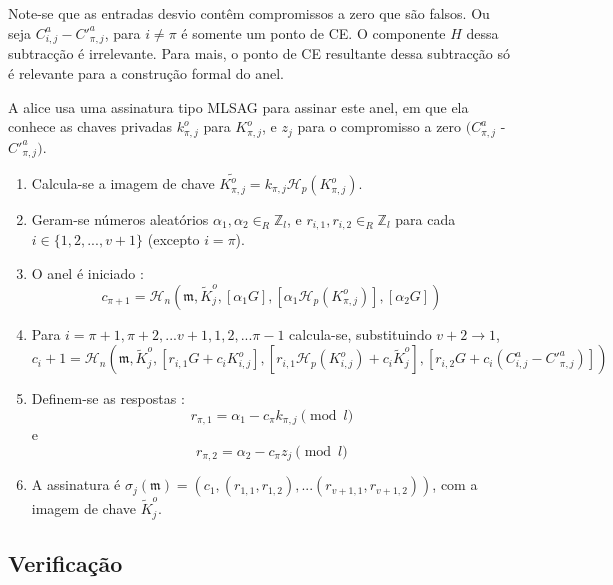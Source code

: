 \newline Note-se que as entradas desvio contêm compromissos a zero que são falsos. Ou seja $C^a_{i, j} - C'^a_{\pi, j}$, para $i\ne\pi$ é somente um ponto de CE. O componente $H$ dessa subtracção é irrelevante. Para mais, o ponto de CE resultante dessa subtracção só é relevante para a construção formal do anel.

A alice usa uma assinatura tipo MLSAG para assinar este anel, em que ela conhece as chaves privadas $k^o_{\pi,j}$ para $K^o_{\pi,j}$, e $z_j$ para o compromisso a zero $(C^a_{\pi,j}$ - $C'^a_{\pi,j})$.

\begin{enumerate}

    \item Calcula-se a imagem de chave \(\tilde{K^o_{\pi, j}} = k_{\pi, j} \mathcal{H}_p(K^o_{\pi, j})\).

    \item Geram-se números aleatórios \(\alpha_{1},\alpha_{2} \in_R \mathbb{Z}_l\), e \(r_{i, 1},r_{i, 2} \in_R \mathbb{Z}_l\) para cada \(i \in \{1, 2, ..., v+1\}\) (excepto \(i = \pi\)).

    \item O anel é iniciado :
    \vspace{.175cm}
	\[c_{\pi+1} = \mathcal{H}_n(\mathfrak{m}, \tilde{K}^o_j, [\alpha_1 G], [\alpha_1 \mathcal{H}_p(K^o_{\pi, j})], [\alpha_2 G])\]
    \vspace{.175cm}

    \item Para \(i = \pi+1, \pi+2, ... v+1, 1, 2, ... \pi-1\) calcula-se, substituindo \(v + 2 \rightarrow 1\),\vspace{.175cm}
\[c_i+1 = \mathcal{H}_n(\mathfrak{m}, \tilde{K}^o_j, [r_{i, 1} G + c_{i} K^o_{i, j}], [r_{i, 1} \mathcal{H}_p(K^o_{i, j}) + c_{i} \tilde{K}^o_j], [r_{i, 2} G + c_{i} (C^a_{i, j} - C'^a_{\pi, j})])\]

    \item Definem-se as respostas : \[r_{\pi, 1} = \alpha_{1} - c_{\pi} k_{\pi, j} \pmod l\] e \[r_{\pi, 2} = \alpha_{2} - c_{\pi} z_j \pmod l\]

    \item A assinatura é \(\sigma_j(\mathfrak{m}) = (c_1, (r_{1, 1}, r_{1, 2}),...  (r_{v+1, 1}, r_{v+1, 2}))\), com a imagem de chave $\tilde{K}^o_j$.

\end{enumerate}

\subsection{Verificação}
\label{full-verify}

